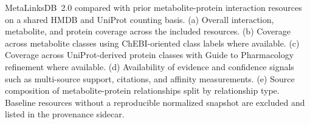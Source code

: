 MetaLinksDB~2.0 compared with prior metabolite-protein interaction resources on a shared HMDB and UniProt counting basis. (a) Overall interaction, metabolite, and protein coverage across the included resources. (b) Coverage across metabolite classes using ChEBI-oriented class labels where available. (c) Coverage across UniProt-derived protein classes with Guide to Pharmacology refinement where available. (d) Availability of evidence and confidence signals such as multi-source support, citations, and affinity measurements. (e) Source composition of metabolite-protein relationships split by relationship type. Baseline resources without a reproducible normalized snapshot are excluded and listed in the provenance sidecar.
